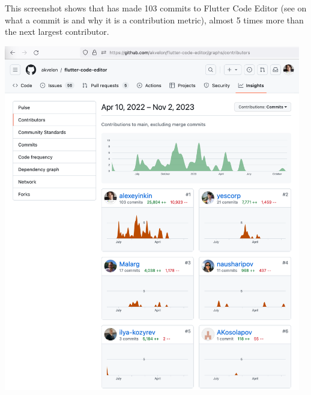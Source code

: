 
This screenshot shows that \mrl has made 103 commits to Flutter Code Editor
(see  on what a commit is and why it is a contribution metric),
almost 5 times more than the next largest contributor.

\begin{center}
    \includegraphics[width=35em]{github-contributors}
\end{center}

\pagebreak
